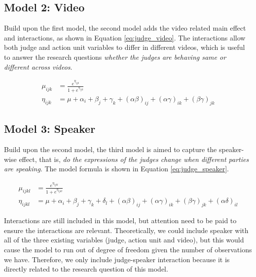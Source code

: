 \documentclass{monashthesis}
\begin{document}
\hypertarget{model-2-video}{%
\subsection{Model 2: Video}\label{model-2-video}}

Build upon the first model, the second model adds the video related main effect and interactions, as shown in Equation \ref{eq:judge_video}. The interactions allow both judge and action unit variables to differ in different videos, which is useful to answer the research questions \emph{whether the judges are behaving same or different across videos}.

\begin{align}\label{eq:judge_video}
\mu_{ijk} &= \frac{e^{\eta_{ijk}}}{1 + e^{\eta_{ijk}}} \\
\eta_{ijk} &= \mu + \alpha_i + \beta_j +\gamma_k + (\alpha\beta)_{ij} + (\alpha\gamma)_{ik} + (\beta\gamma)_{jk}
\end{align}

\noindent 

\hypertarget{model-3-speaker}{%
\subsection{Model 3: Speaker}\label{model-3-speaker}}

Build upon the second model, the third model is aimed to capture the speaker-wise effect, that is, \emph{do the expressions of the judges change when different parties are speaking}. The model formula is shown in Equation \ref{eq:judge_speaker}.

\begin{align}\label{eq:judge_speaker}
\mu_{ijkl} &= \frac{e^{\eta_{ijkl}}}{1 + e^{\eta_{ijkl}}} \\
\eta_{ijkl} &= \mu + \alpha_i + \beta_j +\gamma_k + \delta_l + (\alpha\beta)_{ij} + (\alpha\gamma)_{ik} + (\beta\gamma)_{jk} + (\alpha\delta)_{il}
\end{align}

Interactions are still included in this model, but attention need to be paid to ensure the interactions are relevant. Theoretically, we could include speaker with all of the three existing variables (judge, action unit and video), but this would cause the model to run out of degree of freedom given the number of observations we have. Therefore, we only include judge-speaker interaction because it is directly related to the research question of this model.
\end{document}
